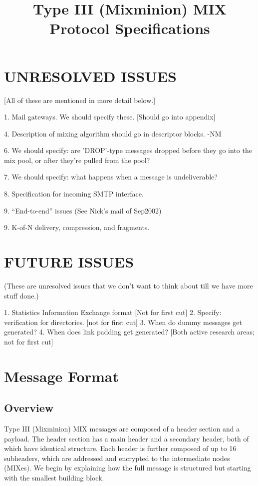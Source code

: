 \title{Type III (Mixminion) MIX Protocol Specifications}

\section{UNRESOLVED ISSUES}

[All of these are mentioned in more detail below.]

1. Mail gateways. We should specify these.
   [Should go into appendix]
     
4. Description of mixing algorithm should go in descriptor blocks. -NM

6. We should specify: are 'DROP'-type messages dropped before they go
    into the mix pool, or after they're pulled from the pool?

7. We should specify: what happens when a message is undeliverable?

8. Specification for incoming SMTP interface.

9. ``End-to-end'' issues (See Nick's mail of Sep2002)

9. K-of-N delivery, compression, and fragments.


\section{FUTURE ISSUES}
(These are unresolved issues that we don't want to think about till we
have more stuff done.)

1. Statistics Information Exchange format
   [Not for first cut]
2. Specify: verification for directories.
	[not for first cut]
3. When do dummy messages get generated?
4. When does link padding get generated?
   [Both active research areas; not for first cut]

\section{Message Format}

\subsection{Overview}

Type III (Mixminion) MIX messages are composed of a header section and a
payload.  The header section has a main header and a
secondary header, both of which have identical structure.  Each
header is further composed of up to 16 subheaders, which are
addressed and encrypted to the intermediate nodes (MIXes).  We
begin by explaining how the full message is structured but starting
with the smallest building block.

